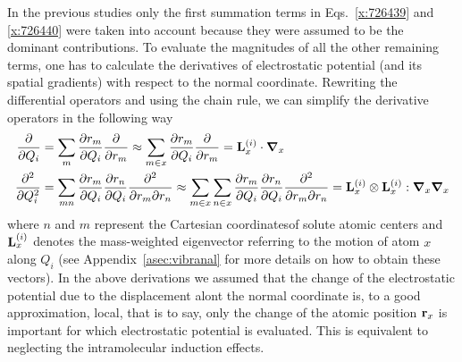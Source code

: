 \documentclass[a4paper,titlepage,twoside,fleqn,12pt]{book}
\newcommand{\BM}[1]{\ensuremath{\mbox{\boldmath${#1}$}}}
\newcommand{\fderiv}[2]{\ensuremath{
\frac{\partial #1}{\partial #2}}}
\newcommand{\sderiv}[2]{\ensuremath{
\frac{\partial^2 #1}{\partial #2^2}
}}
\newcommand{\sderivd}[3]{\ensuremath{
\frac{\partial^2 #1}{\partial #2 \partial #3}
}}
\begin{document}
\begin{refsection}
In the previous studies only the first summation terms in 
Eqs.~\eqref{x:726439} and \eqref{x:726440} were taken into account because 
they were assumed to be the dominant contributions. To evaluate the
magnitudes of all the other remaining terms, one has to calculate
the derivatives of electrostatic potential (and its spatial gradients)
with respect to the normal coordinate. Rewriting the differential 
operators and using the chain rule, we can simplify the
derivative operators in the following way
%
\begin{subequations}  \label{e:deriv-operators}
\begin{align}
\fderiv{}{Q_i} &= \sum_m \fderiv{r_m}{Q_i}\fderiv{}{r_m} 
     \approx \sum_{m\in x} \fderiv{r_m}{Q_i}\fderiv{}{r_m} 
     = {\bf L}_x^{(i)} \cdot {\BM \nabla}_x      \label{e:deriv-operators-1} \\
\sderiv{}{Q_i} &= \sum_{mn} \fderiv{r_m}{Q_i}\fderiv{r_n}{Q_i}\sderivd{}{r_m}{r_n} 
     \approx \sum_{m\in x}\sum_{n\in x} \fderiv{r_m}{Q_i}\fderiv{r_n}{Q_i}\sderivd{}{r_m}{r_n} 
     = {\bf L}_x^{(i)} \otimes {\bf L}_x^{(i)} : {\BM \nabla}_x{\BM \nabla}_x  \label{e:deriv-operators-2}
\end{align}
\end{subequations}
%
where $n$ and $m$ represent the Cartesian coordinatesof solute
atomic centers and ${\bf L}_x^{(i)}$ denotes the mass\hyp{}weighted
eigenvector referring to the motion of atom $x$ along $Q_i$
(see Appendix~\ref{asec:vibranal} for more details on how to obtain these vectors).
In the above derivations we assumed that the change of the electrostatic
potential due to the displacement alont the normal coordinate is, 
to a good approximation, local, that is to say, only the change of the
atomic position ${\bf r}_x$ is important for which electrostatic potential 
is evaluated. This is equivalent to neglecting the intramolecular induction
effects.


\end{refsection}
\end{document}
